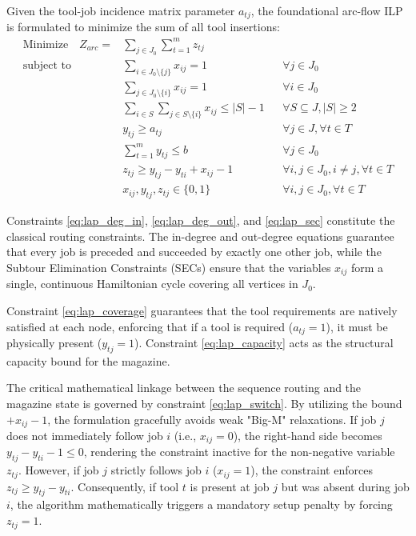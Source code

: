\documentclass[11pt, a4paper]{book}
\begin{document}
	Given the tool-job incidence matrix parameter $a_{tj}$, the foundational arc-flow ILP is formulated to minimize the sum of all tool insertions:
	\begin{align}
		\text{Minimize} \quad Z_{arc} = & \sum_{j \in J_0} \sum_{t=1}^{m} z_{tj} \label{eq:lap_obj} \\
		\text{subject to} \quad & \sum_{i \in J_0 \setminus \{j\}} x_{ij} = 1 && \forall j \in J_0 \label{eq:lap_deg_in} \\
		& \sum_{j \in J_0 \setminus \{i\}} x_{ij} = 1 && \forall i \in J_0 \label{eq:lap_deg_out} \\
		& \sum_{i \in S} \sum_{j \in S \setminus \{i\}} x_{ij} \le |S| - 1 && \forall S \subseteq J, |S| \ge 2 \label{eq:lap_sec} \\
		& y_{tj} \ge a_{tj} && \forall j \in J, \forall t \in T \label{eq:lap_coverage} \\
		& \sum_{t=1}^{m} y_{tj} \le b && \forall j \in J_0 \label{eq:lap_capacity} \\
		& z_{tj} \ge y_{tj} - y_{ti} + x_{ij} - 1 && \forall i, j \in J_0, i \neq j, \forall t \in T \label{eq:lap_switch} \\
		& x_{ij}, y_{tj}, z_{tj} \in \{0,1\} && \forall i, j \in J_0, \forall t \in T \label{eq:lap_binary}
	\end{align}
	
	Constraints \eqref{eq:lap_deg_in}, \eqref{eq:lap_deg_out}, and \eqref{eq:lap_sec} constitute the classical routing constraints. The in-degree and out-degree equations guarantee that every job is preceded and succeeded by exactly one other job, while the Subtour Elimination Constraints (SECs) ensure that the variables $x_{ij}$ form a single, continuous Hamiltonian cycle covering all vertices in $J_0$. 
	
	Constraint \eqref{eq:lap_coverage} guarantees that the tool requirements are natively satisfied at each node, enforcing that if a tool is required ($a_{tj}=1$), it must be physically present ($y_{tj}=1$). Constraint \eqref{eq:lap_capacity} acts as the structural capacity bound for the magazine.
	
	The critical mathematical linkage between the sequence routing and the magazine state is governed by constraint \eqref{eq:lap_switch}. By utilizing the bound $+ x_{ij} - 1$, the formulation gracefully avoids weak "Big-M" relaxations. If job $j$ does not immediately follow job $i$ (i.e., $x_{ij} = 0$), the right-hand side becomes $y_{tj} - y_{ti} - 1 \le 0$, rendering the constraint inactive for the non-negative variable $z_{tj}$. However, if job $j$ strictly follows job $i$ ($x_{ij} = 1$), the constraint enforces $z_{tj} \ge y_{tj} - y_{ti}$. Consequently, if tool $t$ is present at job $j$ but was absent during job $i$, the algorithm mathematically triggers a mandatory setup penalty by forcing $z_{tj} = 1$.
	
\end{document}
